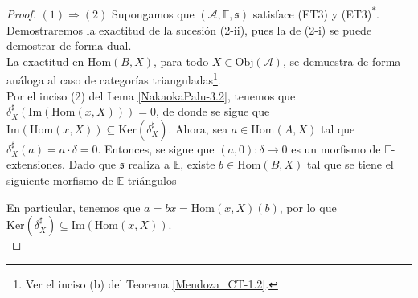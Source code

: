 \documentclass[tesis]{subfiles}
\begin{document}
\begin{proof}\leavevmode

    $(1)\Rightarrow(2)$ Supongamos que $(\mathscr{A},\mathbb{E},\mathfrak{s})$ satisface (ET3) y (ET3)\textsuperscript{$\ast$}. Demostraremos la exactitud de la sucesión (2-ii), pues la de (2-i) se puede demostrar de forma dual. \\

    La exactitud en $\text{Hom}(B,X)$, para todo $X\in\text{Obj}(\mathscr{A})$, se demuestra de forma análoga al caso de categorías trianguladas\footnote{Ver el inciso (b) del Teorema \ref{Mendoza_CT-1.2}.}. \\

    Por el inciso (2) del Lema \ref{NakaokaPalu-3.2}, tenemos que $\delta^\sharp_X(\text{Im}(\text{Hom}(x,X)))=0$, de donde se sigue que $\text{Im}(\text{Hom}(x,X))\subseteq\text{Ker}(\delta^\sharp_X)$. Ahora, sea $a\in\text{Hom}(A,X)$ tal que $\delta^\sharp_X(a)=a\cdot\delta=0$. Entonces, se sigue que $(a,0):\delta\to 0$ es un morfismo de $\mathbb{E}$-extensiones. Dado que $\mathfrak{s}$ realiza a $\mathbb{E}$, existe $b\in\text{Hom}(B,X)$ tal que se tiene el siguiente morfismo de $\mathbb{E}$-triángulos
    \begin{center}
    \end{center}
    En particular, tenemos que $a = bx = \text{Hom}(x,X)(b)$, por lo que $\text{Ker}(\delta^\sharp_X)\subseteq\text{Im}(\text{Hom}(x,X))$. \\


\end{proof}
\end{document}
